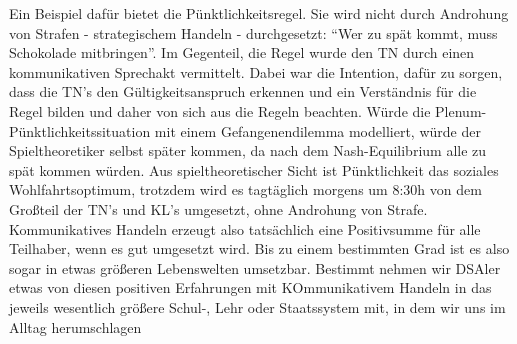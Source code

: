 Ein Beispiel dafür bietet die Pünktlichkeitsregel.
Sie wird nicht durch Androhung von Strafen - strategischem Handeln - durchgesetzt: ``Wer zu spät kommt, muss Schokolade mitbringen''.
Im Gegenteil, die Regel wurde den TN durch einen kommunikativen Sprechakt vermittelt.
Dabei war die Intention, dafür zu sorgen, dass die TN's den Gültigkeitsanspruch erkennen und ein Verständnis für die Regel bilden und daher von sich aus die Regeln beachten.
Würde die Plenum-Pünktlichkeitssituation mit einem Gefangenendilemma modelliert, würde der Spieltheoretiker selbst später kommen, da nach dem Nash-Equilibrium alle zu spät kommen würden.
Aus spieltheoretischer Sicht ist Pünktlichkeit das soziales Wohlfahrtsoptimum, trotzdem wird es tagtäglich morgens um 8:30h von dem Großteil der TN's und KL's umgesetzt, ohne Androhung von Strafe.
Kommunikatives Handeln erzeugt also tatsächlich eine Positivsumme für alle Teilhaber, wenn es gut umgesetzt wird.
Bis zu einem bestimmten Grad ist es also sogar in etwas größeren Lebenswelten umsetzbar.
Bestimmt nehmen wir DSAler etwas von diesen positiven Erfahrungen mit KOmmunikativem Handeln in das jeweils wesentlich größere Schul-, Lehr oder Staatssystem mit, in dem wir uns im Alltag herumschlagen
